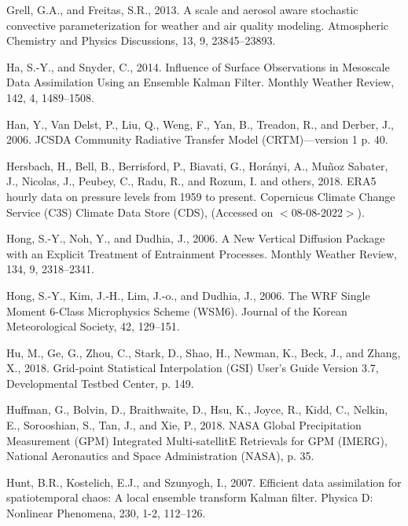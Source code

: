 \documentclass[12pt,twoside]{reedthesis}
\begin{document}
\leavevmode\hypertarget{ref-grell2013}{}%
Grell, G.A., and Freitas, S.R., 2013. A scale and aerosol aware stochastic convective parameterization for weather and air quality modeling. Atmospheric Chemistry and Physics Discussions, 13, 9, 23845--23893.

\leavevmode\hypertarget{ref-ha2014}{}%
Ha, S.-Y., and Snyder, C., 2014. Influence of Surface Observations in Mesoscale Data Assimilation Using an Ensemble Kalman Filter. Monthly Weather Review, 142, 4, 1489--1508.

\leavevmode\hypertarget{ref-han2006}{}%
Han, Y., Van Delst, P., Liu, Q., Weng, F., Yan, B., Treadon, R., and Derber, J., 2006. JCSDA Community Radiative Transfer Model (CRTM)---version 1 p. 40.

\leavevmode\hypertarget{ref-era5pressure}{}%
Hersbach, H., Bell, B., Berrisford, P., Biavati, G., Horányi, A., Muñoz Sabater, J., Nicolas, J., Peubey, C., Radu, R., and Rozum, I. and others, 2018. ERA5 hourly data on pressure levels from 1959 to present. Copernicus Climate Change Service (C3S) Climate Data Store (CDS), (Accessed on \(<\)08-08-2022\(>\)).

\leavevmode\hypertarget{ref-hong2006}{}%
Hong, S.-Y., Noh, Y., and Dudhia, J., 2006. A New Vertical Diffusion Package with an Explicit Treatment of Entrainment Processes. Monthly Weather Review, 134, 9, 2318--2341.

\leavevmode\hypertarget{ref-hong2006a}{}%
Hong, S.-Y., Kim, J.-H., Lim, J.-o., and Dudhia, J., 2006. The WRF Single Moment 6-Class Microphysics Scheme (WSM6). Journal of the Korean Meteorological Society, 42, 129--151.

\leavevmode\hypertarget{ref-hu2018}{}%
Hu, M., Ge, G., Zhou, C., Stark, D., Shao, H., Newman, K., Beck, J., and Zhang, X., 2018. Grid-point Statistical Interpolation (GSI) User's Guide Version 3.7, Developmental Testbed Center, p. 149.

\leavevmode\hypertarget{ref-huffman2018}{}%
Huffman, G., Bolvin, D., Braithwaite, D., Hsu, K., Joyce, R., Kidd, C., Nelkin, E., Sorooshian, S., Tan, J., and Xie, P., 2018. NASA Global Precipitation Measurement (GPM) Integrated Multi-satellitE Retrievals for GPM (IMERG), National Aeronautics and Space Administration (NASA), p. 35.

\leavevmode\hypertarget{ref-hunt2007}{}%
Hunt, B.R., Kostelich, E.J., and Szunyogh, I., 2007. Efficient data assimilation for spatiotemporal chaos: A local ensemble transform Kalman filter. Physica D: Nonlinear Phenomena, 230, 1-2, 112--126.
\end{document}
